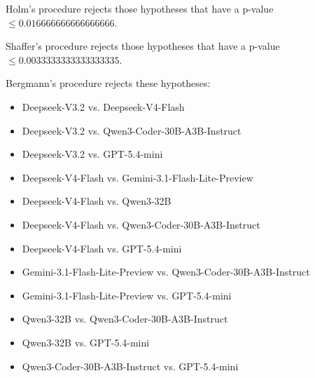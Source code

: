 \documentclass[a4paper,10pt]{article}
\begin{document}
\begin{landscape}
Holm's procedure rejects those hypotheses that have a p-value $\le0.016666666666666666$.


Shaffer's procedure rejects those hypotheses that have a p-value $\le0.0033333333333333335$.


Bergmann's procedure rejects these hypotheses:


\begin{itemize}


\item Deepseek-V3.2 vs. Deepseek-V4-Flash\item Deepseek-V3.2 vs. Qwen3-Coder-30B-A3B-Instruct\item Deepseek-V3.2 vs. GPT-5.4-mini\item Deepseek-V4-Flash vs. Gemini-3.1-Flash-Lite-Preview\item Deepseek-V4-Flash vs. Qwen3-32B\item Deepseek-V4-Flash vs. Qwen3-Coder-30B-A3B-Instruct\item Deepseek-V4-Flash vs. GPT-5.4-mini\item Gemini-3.1-Flash-Lite-Preview vs. Qwen3-Coder-30B-A3B-Instruct\item Gemini-3.1-Flash-Lite-Preview vs. GPT-5.4-mini\item Qwen3-32B vs. Qwen3-Coder-30B-A3B-Instruct\item Qwen3-32B vs. GPT-5.4-mini\item Qwen3-Coder-30B-A3B-Instruct vs. GPT-5.4-mini\end{itemize}



\end{landscape}
\end{document}
